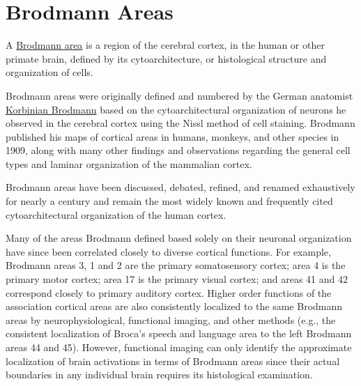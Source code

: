 \hypertarget{brodmann-areas}{%
\chapter{Brodmann Areas}\label{brodmann-areas}}

A \href{https://en.wikipedia.org/wiki/Brodmann_area}{Brodmann area} is a region of the cerebral cortex, in the human or other primate brain, defined by its cytoarchitecture, or histological structure and organization of cells.

Brodmann areas were originally defined and numbered by the German anatomist \href{https://en.wikipedia.org/wiki/Korbinian_Brodmann}{Korbinian Brodmann} based on the cytoarchitectural organization of neurons he observed in the cerebral cortex using the Nissl method of cell staining. Brodmann published his maps of cortical areas in humans, monkeys, and other species in 1909, along with many other findings and observations regarding the general cell types and laminar organization of the mammalian cortex.

Brodmann areas have been discussed, debated, refined, and renamed exhaustively for nearly a century and remain the most widely known and frequently cited cytoarchitectural organization of the human cortex.

Many of the areas Brodmann defined based solely on their neuronal organization have since been correlated closely to diverse cortical functions. For example, Brodmann areas 3, 1 and 2 are the primary somatosensory cortex; area 4 is the primary motor cortex; area 17 is the primary visual cortex; and areas 41 and 42 correspond closely to primary auditory cortex. Higher order functions of the association cortical areas are also consistently localized to the same Brodmann areas by neurophysiological, functional imaging, and other methods (e.g., the consistent localization of Broca's speech and language area to the left Brodmann areas 44 and 45). However, functional imaging can only identify the approximate localization of brain activations in terms of Brodmann areas since their actual boundaries in any individual brain requires its histological examination.


